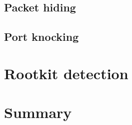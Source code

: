 \documentclass[10pt, letterpaper]{scrartcl}
\begin{document}
\subsection{Packet hiding}


\subsection{Port knocking}


\section{Rootkit detection}

\section{Summary}
\end{document}
